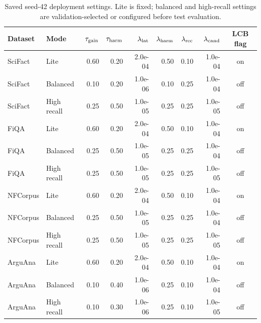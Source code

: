 \begin{table}[!htbp]
\centering
\caption{Saved seed-42 deployment settings. Lite is fixed; balanced and high-recall settings are validation-selected or configured before test evaluation.}
\label{tab:mode_configs}
\scriptsize
\setlength{\tabcolsep}{3.0pt}
\begin{tabular}{llrrrrrrc}
\toprule
Dataset & Mode & $\tau_{\rm gain}$ & $\tau_{\rm harm}$ & $\lambda_{\rm lat}$ & $\lambda_{\rm harm}$ & $\lambda_{\rm rec}$ & $\lambda_{\rm cand}$ & LCB flag \\
\midrule
SciFact & Lite & 0.60 & 0.20 & 2.0e-04 & 0.50 & 0.10 & 1.0e-04 & on \\
SciFact & Balanced & 0.10 & 0.20 & 1.0e-06 & 0.10 & 0.25 & 1.0e-04 & off \\
SciFact & High recall & 0.25 & 0.50 & 1.0e-05 & 0.25 & 0.25 & 1.0e-05 & off \\
\addlinespace[1pt]
FiQA & Lite & 0.60 & 0.20 & 2.0e-04 & 0.50 & 0.10 & 1.0e-04 & on \\
FiQA & Balanced & 0.25 & 0.50 & 1.0e-05 & 0.25 & 0.25 & 1.0e-04 & off \\
FiQA & High recall & 0.25 & 0.50 & 1.0e-05 & 0.25 & 0.25 & 1.0e-05 & off \\
\addlinespace[1pt]
NFCorpus & Lite & 0.60 & 0.20 & 2.0e-04 & 0.50 & 0.10 & 1.0e-04 & on \\
NFCorpus & Balanced & 0.25 & 0.50 & 1.0e-05 & 0.25 & 0.25 & 1.0e-04 & off \\
NFCorpus & High recall & 0.25 & 0.50 & 1.0e-05 & 0.25 & 0.25 & 1.0e-05 & off \\
\addlinespace[1pt]
ArguAna & Lite & 0.60 & 0.20 & 2.0e-04 & 0.50 & 0.10 & 1.0e-04 & on \\
ArguAna & Balanced & 0.10 & 0.40 & 1.0e-06 & 0.25 & 0.10 & 1.0e-04 & off \\
ArguAna & High recall & 0.10 & 0.30 & 1.0e-06 & 0.25 & 0.10 & 1.0e-05 & off \\
\bottomrule
\end{tabular}
\end{table}
